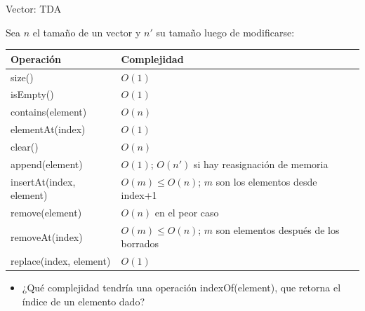 \documentclass{beamer} %
\begin{document}
\begin{frame}{Vector: TDA}
    \scriptsize{
    Sea $n$ el tamaño de un vector y $n'$ su tamaño luego de modificarse:
    \medskip
    
    \begin{tabular}{lp{60ex}}\hline
      {\bf Operación}   & {\bf Complejidad}\\\hline
      size()            & $O(1)$\\
      isEmpty()         & $O(1)$\\
      contains(element) & $O(n)$\\
      elementAt(index)  & $O(1)$\\
      clear()           & $O(n)$\\
      append(element)   & $O(1)$; $O(n')$ si hay reasignación de memoria\\
      insertAt(index, element) & $O(m)\leq O(n)$; $m$ son los elementos desde index+1\\
      remove(element)   & $O(n)$ en el peor caso\\
      removeAt(index)   & $O(m)\leq O(n)$; $m$ son elementos después de los borrados\\
      replace(index, element) & $O(1)$\\[1.5ex]\hline
    \end{tabular}

    \begin{itemize}
        \item<2-> ¿Qué complejidad tendría una operación       indexOf(element), que retorna el índice de un elemento dado?
    \end{itemize}}
\end{frame}
\end{document}
